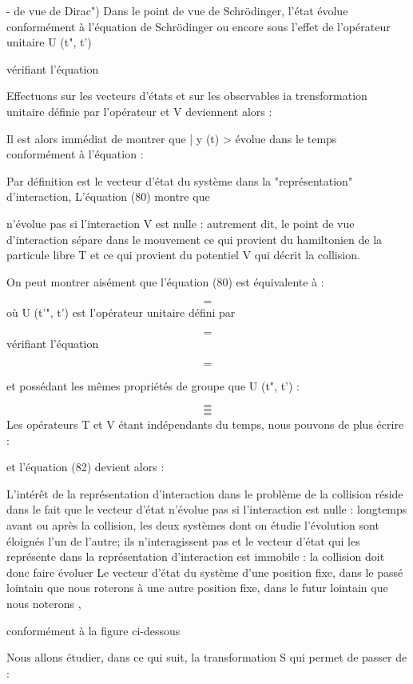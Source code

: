 {{{- de vue de Dirac")
Dans le point de vue de Schrödinger, l'état  évolue
conformément à l'équation de Schrödinger
ou encore sous l'effet de l'opérateur unitaire U (t", t')

 vérifiant l'équation

Effectuons sur les vecteurs d'états et sur les observables ia trensformation
unitaire définie par l'opérateur  et V deviennent
alors :

Il est alors immédiat de montrer que | y (t) > évolue dans le temps conformément
à l'équation :


Par définition  est le vecteur d'état du système dans
la "représentation" d'interaction, L'équation (80) montre que

 n'évolue pas si l'interaction V est nulle : autrement
dit, le point de vue d'interaction sépare dans le mouvement ce
qui provient du hamiltonien de la particule libre T et ce qui
provient du potentiel V qui décrit la collision.

On peut montrer aisément que l'équation (80) est équivalente à :

\[
\tag{81}=
\]
où U (t'", t') est l'opérateur unitaire défini par

\[
\tag{82}=
\]
vérifiant l'équation

\[
\tag{83}=
\]

et possédant les mêmes propriétés de groupe que U (t", t') :

\[
\tag{84-a}=
\]
\[
\tag{84-b}=
\]
\[
\tag{84-c}=
\]
Les opérateurs T et V étant indépendants du temps, nous pouvons
de plus écrire :

et l'équation (82) devient alors :

% 
L'intérêt de la représentation d'interaction dans le problème de la collision
réside dans le fait que le vecteur d'état n'évolue
pas si l'interaction est nulle : longtemps avant ou après la collision,
les deux systèmes dont on étudie l'évolution sont éloignés l'un de
l'autre; ils n'interagissent pas et le vecteur d'état qui les représente dans
la représentation d'interaction est immobile : la collision
doit donc faire évoluer Le vecteur d'état du système d'une position
fixe, dans le passé lointain que nous roterons  à une
autre position fixe, dans le futur lointain que nous noterons ,

conformément à la figure ci-dessous

Nous allons étudier, dans ce qui suit, la transformation S qui permet de
passer de :

}}}
